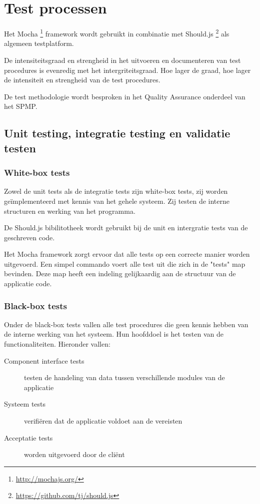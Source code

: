 \documentclass[a4paper]{article}
\begin{document}
\section{Test processen}

 Het Mocha \footnote{\url{http://mochajs.org/}} framework wordt gebruikt in combinatie met Should.js \footnote{\url{https://github.com/tj/should.js}} als algemeen testplatform.\newline

De intensiteitsgraad en strengheid in het uitvoeren en documenteren van test procedures is evenredig met het intergriteitsgraad. Hoe lager de graad, hoe lager de intensiteit en strengheid van de test procedures.\newline

De test methodologie wordt besproken in het Quality Assurance onderdeel van het SPMP.

\subsection{Unit testing, integratie testing en validatie testen}

\subsubsection{White-box tests}

Zowel de unit tests als de integratie tests zijn white-box tests, zij worden geïmplementeerd met kennis van het gehele systeem. Zij testen de interne structuren en werking van het programma.\newline

De Should.js bibilitotheek wordt gebruikt bij de unit en intergratie tests van de geschreven code. 

Het Mocha framework zorgt ervoor dat alle tests op een correcte manier worden uitgevoerd. Een simpel commando voert alle test uit die zich in de "tests" map bevinden. Deze map heeft een indeling gelijkaardig aan de structuur van de applicatie code.


\subsubsection{Black-box tests}

Onder de black-box tests vallen alle test procedures die geen kennis hebben van de interne werking van het systeem. Hun hoofddoel is het testen van de functionaliteiten. 
Hieronder vallen:

\begin{description}

\item[Component interface tests] testen de handeling van data tussen verschillende modules van de applicatie
\item[Systeem tests] verifiëren dat de applicatie voldoet aan de vereisten 
\item[Acceptatie tests] worden uitgevoerd door de cliënt

\end{description}
\end{document}
